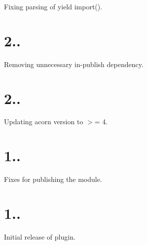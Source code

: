 
\begin{DoxyItemize}
\item Fixing parsing of {\ttfamily yield import()}.
\end{DoxyItemize}

\section*{2..}


\begin{DoxyItemize}
\item Removing unnecessary {\ttfamily in-\/publish} dependency.
\end{DoxyItemize}

\section*{2..}


\begin{DoxyItemize}
\item Updating acorn version to $>$= 4.
\end{DoxyItemize}

\section*{1..}


\begin{DoxyItemize}
\item Fixes for publishing the module.
\end{DoxyItemize}

\section*{1..}


\begin{DoxyItemize}
\item Initial release of plugin. 
\end{DoxyItemize}
